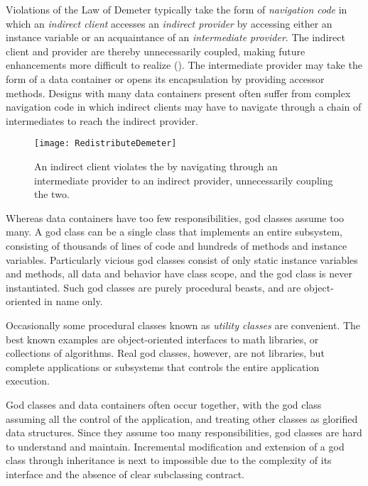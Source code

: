 \documentclass[a4paper,10pt,twoside]{book}
\begin{document}
Violations of the Law of Demeter typically take the form of \emph{navigation code} in which an \emph{indirect client} accesses an \emph{indirect provider} by accessing either an instance variable or an acquaintance of an \emph{intermediate provider}. The indirect client and provider are thereby unnecessarily coupled, making future enhancements more difficult to realize (). The intermediate provider may take the form of a data container or opens its encapsulation by providing accessor methods. Designs with many data containers present often suffer from complex navigation code in which indirect clients may have to navigate through a chain of intermediates to reach the indirect provider.

\begin{figure}[h]
\begin{center}
\texttt{[image: RedistributeDemeter]}
\caption{An indirect client violates the  by navigating through an intermediate provider to an indirect provider, unnecessarily coupling the two.}
\end{center}
\end{figure}

Whereas data containers have too few responsibilities, god classes assume too many. A god class can be a single class that implements an entire subsystem, consisting of thousands of lines of code and hundreds of methods and instance variables. Particularly vicious god classes consist of only static instance variables and methods, \ie all data and behavior have class scope, and the god class is never instantiated. Such god classes are purely procedural beasts, and are object-oriented in name only. 

Occasionally some procedural classes known as \emph{utility classes} are convenient. The best known examples are object-oriented interfaces to math libraries, or collections of algorithms. Real god classes, however, are not libraries, but complete applications or subsystems that controls the entire application execution.

God classes and data containers often occur together, with the god class assuming all the control of the application, and treating other classes as glorified data structures. Since they assume too many responsibilities, god classes are hard to understand and maintain. Incremental modification and extension of a god class through inheritance is next to impossible due to the complexity of its interface and the absence of clear subclassing contract.
\end{document}
